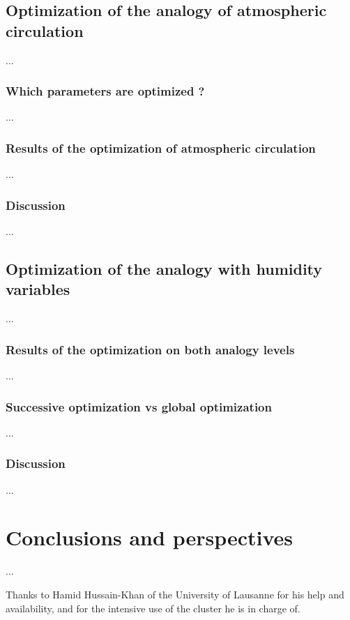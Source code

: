 \documentclass[twocol]{ametsoc}
\begin{document}
\subsection{Optimization of the analogy of atmospheric circulation}
...

\subsubsection{Which parameters are optimized ?}
...

\subsubsection{Results of the optimization of atmospheric circulation}
...

\subsubsection{Discussion}
...


\subsection{Optimization of the analogy with humidity variables}
...

\subsubsection{Results of the optimization on both analogy levels}
...

\subsubsection{Successive optimization vs global optimization}
...

\subsubsection{Discussion}
...


\section{Conclusions and perspectives}
...



%
\acknowledgments
Thanks to Hamid Hussain-Khan of the University of Lausanne for his help and availability, and for the intensive use of the cluster he is in charge of.
\end{document}
